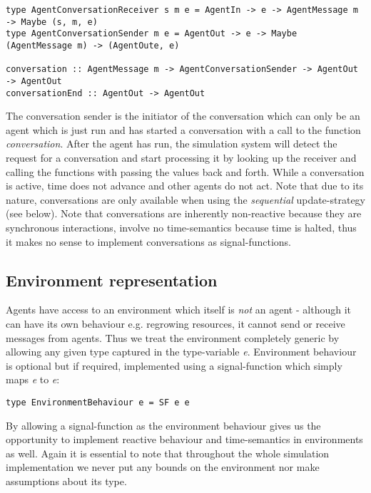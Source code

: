 \begin{verbatim}
type AgentConversationReceiver s m e = AgentIn -> e -> AgentMessage m -> Maybe (s, m, e)
type AgentConversationSender m e = AgentOut -> e -> Maybe (AgentMessage m) -> (AgentOute, e)
                                        
conversation :: AgentMessage m -> AgentConversationSender -> AgentOut -> AgentOut
conversationEnd :: AgentOut -> AgentOut 
\end{verbatim}

The conversation sender is the initiator of the conversation which can only be an agent which is just run and has started a conversation with a call to the function \textit{conversation}. After the agent has run, the simulation system will detect the request for a conversation and start processing it by looking up the receiver and calling the functions with passing the values back and forth. While a conversation is active, time does not advance and other agents do not act. Note that due to its nature, conversations are only available when using the \textit{sequential} update-strategy (see below). Note that conversations are inherently non-reactive because they are synchronous interactions, involve no time-semantics because time is halted, thus it makes no sense to implement conversations as signal-functions.

\subsection{Environment representation}
Agents have access to an environment which itself is \textit{not} an agent - although it can have its own behaviour e.g. regrowing resources, it cannot send or receive messages from agents. Thus we treat the environment completely generic by allowing any given type captured in the type-variable \textit{e}. Environment behaviour is optional but if required, implemented using a signal-function which simply maps \textit{e} to \textit{e}:

\begin{verbatim}
type EnvironmentBehaviour e = SF e e
\end{verbatim}

By allowing a signal-function as the environment behaviour gives us the opportunity to implement reactive behaviour and time-semantics in environments as well. Again it is essential to note that throughout the whole simulation implementation we never put any bounds on the environment nor make assumptions about its type.

